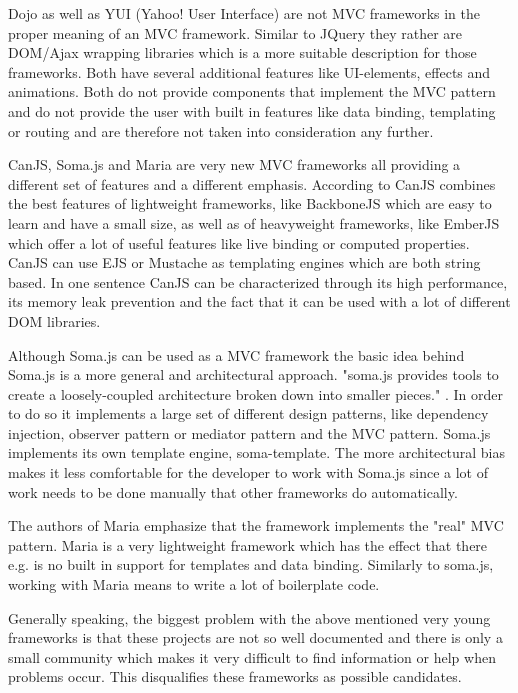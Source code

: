 Dojo as well as YUI (Yahoo! User Interface) are not MVC frameworks in the proper meaning of an MVC framework.
Similar to JQuery they rather are DOM/Ajax wrapping libraries which is a more suitable description for those frameworks.
Both have several additional features like UI-elements, effects and animations.
Both do not provide components that implement the MVC pattern and do not provide the user with built in features like data binding, templating or routing and are therefore not taken into consideration any further.

CanJS, Soma.js and Maria are very new MVC frameworks all providing a different set of features and a different emphasis.
According to \autocite{tech-ana:canJS-presentation} CanJS combines the best features of lightweight frameworks, like BackboneJS which are easy to learn and have a small size, as well as of heavyweight frameworks, like EmberJS which offer a lot of useful features like live binding or computed properties.
CanJS can use EJS or Mustache as templating engines which are both string based.
In one sentence CanJS can be characterized through its high performance, its memory leak prevention and the fact that it can be used with a lot of different DOM libraries.

Although Soma.js can be used as a MVC framework the basic idea behind Soma.js is a more general and architectural approach.
"soma.js  provides tools to create a loosely-coupled architecture broken down into smaller pieces." \autocite{tech-ana:somaJS}. In order to do so it implements a large set of different design patterns, like dependency injection, observer pattern or mediator pattern and the MVC pattern.
Soma.js implements its own template engine, soma-template.
The more architectural bias makes it less comfortable for the developer to work with Soma.js since a lot of work needs to be done manually that other frameworks do automatically.

The authors of Maria emphasize that the framework implements the "real" MVC pattern.
Maria is a very lightweight framework which has the effect that there e.g. is no built in support for templates and data binding.
Similarly to soma.js, working with Maria means to write a lot of boilerplate code.

Generally speaking, the biggest problem with the above mentioned very young frameworks is that these projects are not so well documented and there is only a small community which makes it very difficult to find information or help when problems occur.
This disqualifies these frameworks as possible candidates.

